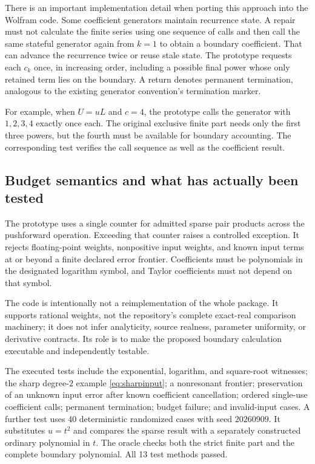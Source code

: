 \documentclass[11pt,letterpaper]{article}
\newcommand{\code}[1]{\texttt{\detokenize{#1}}}
\begin{document}
There is an important implementation detail when porting this approach into the Wolfram code. Some coefficient generators maintain recurrence state. A repair must not calculate the finite series using one sequence of calls and then call the same stateful generator again from $k=1$ to obtain a boundary coefficient. That can advance the recurrence twice or reuse stale state. The prototype requests each $c_k$ once, in increasing order, including a possible final power whose only retained term lies on the boundary. A \code{None} return denotes permanent termination, analogous to the existing generator convention's termination marker.

For example, when $U=uL$ and $c=4$, the prototype calls the generator with $1,2,3,4$ exactly once each. The original exclusive finite part needs only the first three powers, but the fourth must be available for boundary accounting. The corresponding test verifies the call sequence as well as the coefficient result.

\subsection{Budget semantics and what has actually been tested}
The prototype uses a single counter for admitted sparse pair products across the pushforward operation. Exceeding that counter raises a controlled \code{BudgetExceeded} exception. It rejects floating-point weights, nonpositive input weights, and known input terms at or beyond a finite declared error frontier. Coefficients must be polynomials in the designated logarithm symbol, and Taylor coefficients must not depend on that symbol.

The code is intentionally not a reimplementation of the whole package. It supports rational weights, not the repository's complete exact-real comparison machinery; it does not infer analyticity, source realness, parameter uniformity, or derivative contracts. Its role is to make the proposed boundary calculation executable and independently testable.

The executed tests include the exponential, logarithm, and square-root witnesses; the sharp degree-$2$ example \eqref{eq:sharpinput}; a nonresonant frontier; preservation of an unknown input error after known coefficient cancellation; ordered single-use coefficient calls; permanent termination; budget failure; and invalid-input cases. A further test uses 40 deterministic randomized cases with seed $20260909$. It substitutes $u=t^2$ and compares the sparse result with a separately constructed ordinary polynomial in $t$. The oracle checks both the strict finite part and the complete boundary polynomial. All 13 test methods passed.\cite{evidence-python}
\end{document}
